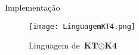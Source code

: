 \begin{frame}{Implementação}
    \begin{figure}[htbp]
        \centering
        \texttt{[image: LinguagemKT4.png]}
        \caption{Linguagem de \(\textbf{KT} \odot \textbf{K4}\)}
    \end{figure}
\end{frame}